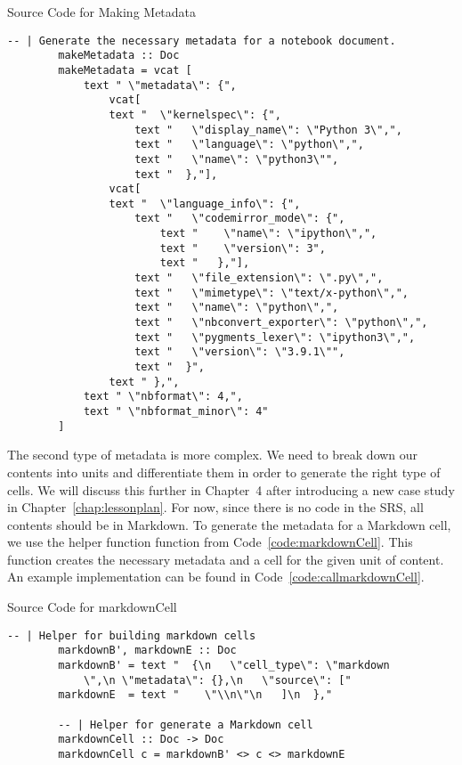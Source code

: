 \begin{listing}[h!]
	\caption{Source Code for Making Metadata}
	\label{code:makeMetadata}
	\begin{lstlisting}[language=haskell1]
		-- | Generate the necessary metadata for a notebook document.
		makeMetadata :: Doc  
		makeMetadata = vcat [
			text " \"metadata\": {", 
				vcat[
				text "  \"kernelspec\": {", 
					text "   \"display_name\": \"Python 3\",", 
					text "   \"language\": \"python\",",
					text "   \"name\": \"python3\"", 
					text "  },"],
				vcat[
				text "  \"language_info\": {", 
					text "   \"codemirror_mode\": {", 
						text "    \"name\": \"ipython\",",
						text "    \"version\": 3",
						text "   },"],
					text "   \"file_extension\": \".py\",", 
					text "   \"mimetype\": \"text/x-python\",",
					text "   \"name\": \"python\",",
					text "   \"nbconvert_exporter\": \"python\",",
					text "   \"pygments_lexer\": \"ipython3\",",
					text "   \"version\": \"3.9.1\"",
					text "  }",
				text " },",
			text " \"nbformat\": 4,", 
			text " \"nbformat_minor\": 4" 
		]
	\end{lstlisting}
\end{listing}

The second type of metadata is more complex. We need to break down our contents 
into units and differentiate them in order to generate the right type of cells. 
We will discuss this further in Chapter~4  after introducing a 
new case study in Chapter~\ref{chap:lessonplan}. For now, since there is no 
code in the SRS, all contents should be in Markdown. To generate the metadata 
for a Markdown cell, we use the helper function  function 
from Code~\ref{code:markdownCell}. This function creates the necessary metadata 
and a cell for the given unit of content. An example implementation can be 
found in Code~\ref{code:callmarkdownCell}.

\begin{listing}[h]
	\caption{Source Code for markdownCell}
	\label{code:markdownCell}
	\begin{lstlisting}[language=haskell1]
		-- | Helper for building markdown cells
		markdownB', markdownE :: Doc
		markdownB' = text "  {\n   \"cell_type\": \"markdown
			\",\n \"metadata\": {},\n   \"source\": [" 
		markdownE  = text "    \"\\n\"\n   ]\n  },"
			
		-- | Helper for generate a Markdown cell
		markdownCell :: Doc -> Doc
		markdownCell c = markdownB' <> c <> markdownE
	\end{lstlisting}
\end{listing}

